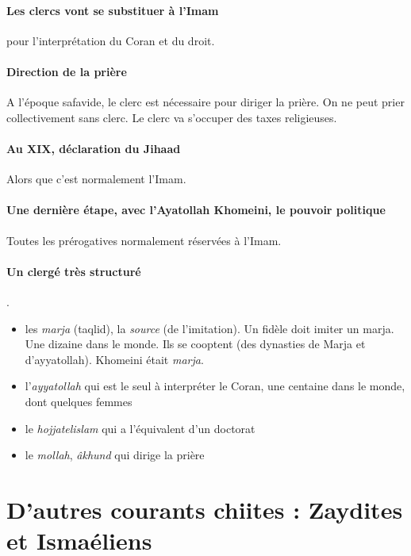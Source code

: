  \paragraph{Les clercs vont se substituer à l'Imam} pour l'interprétation du Coran et du droit. 
 
 \paragraph{Direction de la prière} A l'époque safavide, le clerc est nécessaire pour diriger la prière. On ne peut prier collectivement sans clerc. Le clerc va s'occuper des taxes religieuses.
 \paragraph{Au XIX, déclaration du Jihaad} Alors que c'est normalement l'Imam.
 
 \paragraph{Une dernière étape, avec l'Ayatollah Khomeini, le pouvoir politique} Toutes les prérogatives normalement réservées à l'Imam.
 
 \paragraph{Un clergé très structuré}. 
 \begin{itemize}
     \item les \emph{marja} (taqlid), la \emph{source} (de l'imitation). Un fidèle doit imiter un marja. Une dizaine dans le monde. Ils se cooptent (des dynasties de Marja et d'ayyatollah). Khomeini était \textit{marja}.
     \item l'\emph{ayyatollah} qui est le seul à interpréter le Coran, une centaine dans le monde, dont quelques femmes
     \item le \emph{hojjatelislam} qui a l'équivalent d'un doctorat
     \item le \emph{mollah}, \emph{âkhund} qui dirige la prière
 \end{itemize}
 
 
 
  \section{D'autres courants chiites :
  Zaydites et
  Ismaéliens} 
 
